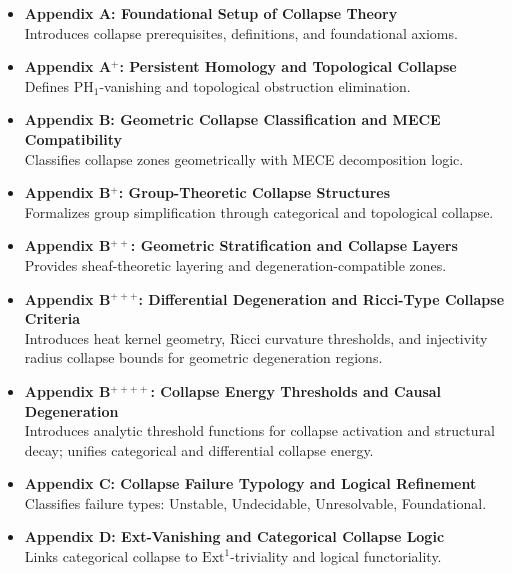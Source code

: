 \documentclass[11pt]{article}
\begin{document}
\begin{itemize}

  \item \textbf{Appendix A: Foundational Setup of Collapse Theory} \\
  Introduces collapse prerequisites, definitions, and foundational axioms.

  \item \textbf{Appendix A$^+$: Persistent Homology and Topological Collapse} \\
  Defines $\mathrm{PH}_1$-vanishing and topological obstruction elimination.

  \item \textbf{Appendix B: Geometric Collapse Classification and MECE Compatibility} \\
  Classifies collapse zones geometrically with MECE decomposition logic.

  \item \textbf{Appendix B$^+$: Group-Theoretic Collapse Structures} \\
  Formalizes group simplification through categorical and topological collapse.

  \item \textbf{Appendix B$^{++}$: Geometric Stratification and Collapse Layers} \\
  Provides sheaf-theoretic layering and degeneration-compatible zones.

  \item \textbf{Appendix B$^{+++}$: Differential Degeneration and Ricci-Type Collapse Criteria} \\
  Introduces heat kernel geometry, Ricci curvature thresholds, and injectivity radius collapse bounds for geometric degeneration regions.

  \item \textbf{Appendix B$^{++++}$: Collapse Energy Thresholds and Causal Degeneration} \\
  Introduces analytic threshold functions for collapse activation and structural decay; unifies categorical and differential collapse energy.

  \item \textbf{Appendix C: Collapse Failure Typology and Logical Refinement} \\
  Classifies failure types: Unstable, Undecidable, Unresolvable, Foundational.

  \item \textbf{Appendix D: Ext-Vanishing and Categorical Collapse Logic} \\
  Links categorical collapse to $\mathrm{Ext}^1$-triviality and logical functoriality.


\end{itemize}
\end{document}
